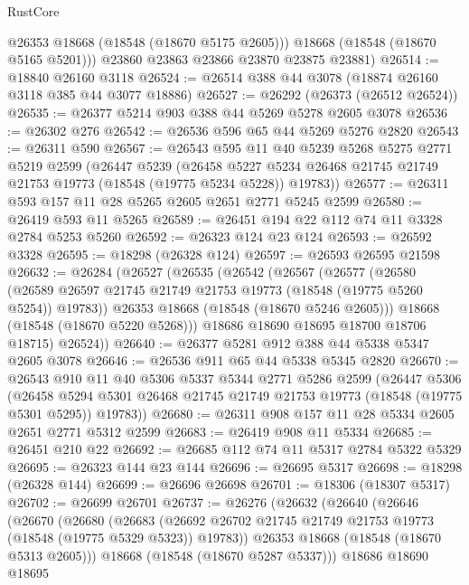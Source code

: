 \begin{lexlean}{RustCore}
\begin{coremodule}
          @26353
          @18668
          (@18548 (@18670 @5175 @2605)))
        @18668
        (@18548 (@18670 @5165 @5201)))
      @23860
      @23863
      @23866
      @23870
      @23875
      @23881)
@26514 := @18840 @26160 @3118
@26524 := @26514 @388 @44 @3078 (@18874 @26160 @3118 @385 @44 @3077 @18886)
@26527 := @26292 (@26373 (@26512 @26524))
@26535 := @26377 @5214 @903 @388 @44 @5269 @5278 @2605 @3078
@26536 := @26302 @276
@26542 := @26536 @596 @65 @44 @5269 @5276 @2820
@26543 := @26311 @590
@26567 := @26543
    @595
    @11
    @40
    @5239
    @5268
    @5275
    @2771
    @5219
    @2599
    (@26447
      @5239
      (@26458 @5227 @5234 @26468 @21745 @21749 @21753 @19773 (@18548 (@19775 @5234 @5228)) @19783))
@26577 := @26311 @593 @157 @11 @28 @5265 @2605 @2651 @2771 @5245 @2599
@26580 := @26419 @593 @11 @5265
@26589 := @26451 @194 @22 @112 @74 @11 @3328 @2784 @5253 @5260
@26592 := @26323 @124 @23 @124
@26593 := @26592 @3328
@26595 := @18298 (@26328 @124)
@26597 := @26593 @26595 @21598
@26632 := @26284
    (@26527
      (@26535
        (@26542
          (@26567
            (@26577
              (@26580
                (@26589 @26597 @21745 @21749 @21753 @19773 (@18548 (@19775 @5260 @5254)) @19783))
              @26353
              @18668
              (@18548 (@18670 @5246 @2605)))
            @18668
            (@18548 (@18670 @5220 @5268)))
          @18686
          @18690
          @18695
          @18700
          @18706
          @18715)
        @26524))
@26640 := @26377 @5281 @912 @388 @44 @5338 @5347 @2605 @3078
@26646 := @26536 @911 @65 @44 @5338 @5345 @2820
@26670 := @26543
    @910
    @11
    @40
    @5306
    @5337
    @5344
    @2771
    @5286
    @2599
    (@26447
      @5306
      (@26458 @5294 @5301 @26468 @21745 @21749 @21753 @19773 (@18548 (@19775 @5301 @5295)) @19783))
@26680 := @26311 @908 @157 @11 @28 @5334 @2605 @2651 @2771 @5312 @2599
@26683 := @26419 @908 @11 @5334
@26685 := @26451 @210 @22
@26692 := @26685 @112 @74 @11 @5317 @2784 @5322 @5329
@26695 := @26323 @144 @23 @144
@26696 := @26695 @5317
@26698 := @18298 (@26328 @144)
@26699 := @26696 @26698
@26701 := @18306 (@18307 @5317)
@26702 := @26699 @26701
@26737 := @26276
    (@26632
      (@26640
        (@26646
          (@26670
            (@26680
              (@26683
                (@26692 @26702 @21745 @21749 @21753 @19773 (@18548 (@19775 @5329 @5323)) @19783))
              @26353
              @18668
              (@18548 (@18670 @5313 @2605)))
            @18668
            (@18548 (@18670 @5287 @5337)))
          @18686
          @18690
          @18695

\end{coremodule}
\end{lexlean}
